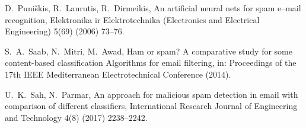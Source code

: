 \documentclass[11pt,a4paper]{article}
\begin{document}
\begin{thebibliography}{99}
\begin{small}
  D.\ Puni\v skis, R.\ Laurutis, R.\ Dirmeikis,
  An artificial neural nets for spam e–mail recognition,
  Elektronika ir Elektrotechnika (Electronics and Electrical Engineering) 5(69) (2006) 73--76.

  S.\ A.\ Saab, N.\ Mitri, M.\ Awad, 
  Ham or spam? A comparative study for some content-based classification Algorithms for email filtering,
  in: Proceedings of the 17th IEEE Mediterranean Electrotechnical Conference (2014).

  U.\ K.\ Sah, N.\ Parmar, 
  An approach for malicious spam detection in email with comparison of different classifiers,
  International Research Journal of Engineering and Technology 4(8) (2017) 2238--2242.        

\end{small}
\end{thebibliography}

\newpage
\end{document}
